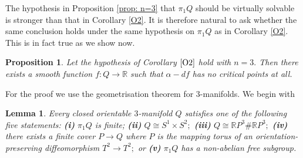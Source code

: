 \documentclass{article}
\theoremstyle{plain}%
\newtheorem{prop}[thm]{Proposition}
\newtheorem{lem}[thm]{Lemma}
\theoremstyle{definition}
\numberwithin{equation}{section}
\numberwithin{figure}{section}
\def\l{\label}
\def\R{{\mathbin{\mathbb R}}}
\def\al{\alpha}
\def\t{\times}
\begin{document}
The hypothesis in Proposition \ref{prop: n=3} that $\pi_1Q$ should be virtually solvable is stronger than that in Corollary \ref{O2}. It is therefore natural to ask whether the same conclusion holds under the same hypothesis on $\pi_1Q$ as in Corollary \ref{O2}. This is in fact true as we show now.
\begin{prop}\l{O3}
Let the hypothesis of Corollary $\ref{O2}$ hold with $n=3.$ Then there exists a smooth function $f:Q\to\R$ such that $\al-df$ has no critical points at all.
\end{prop}
For the proof we use the geometrisation theorem for $3$-manifolds. We begin with
\begin{lem}\l{lem: 3-manifold}
Every closed orientable $3$-manifold $Q$ satisfies one of the following five statements:
{\bf(i)} $\pi_1Q$ is finite;
{\bf(ii)} $Q\cong S^1\t S^2;$
{\bf(iii)} $Q\cong \R P^3\# \R P^3;$
{\bf(iv)} there exists a finite cover $P\to Q$ where $P$ is the mapping torus of an orientation-preserving diffeomorphism $T^2\to T^2;$ or
{\bf(v)} $\pi_1Q$ has a non-abelian free subgroup.
\end{lem}
\end{document}

